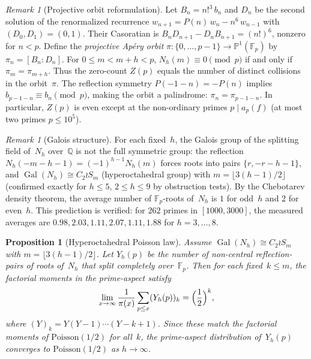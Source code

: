 \documentclass[11pt]{article}
\newtheorem{proposition}[theorem]{Proposition}
\theoremstyle{definition}
\theoremstyle{remark}
\newtheorem{remark}[theorem]{Remark}
\begin{document}
\begin{remark}[Projective orbit reformulation]\label{rem:orbit}
Let $B_n = n!^3\,b_n$ and $D_n$ be the second solution of the
renormalized recurrence $w_{n+1} = P(n)\,w_n - n^6\,w_{n-1}$
with $(D_0, D_1) = (0, 1)$. Their Casoratian is
$B_n D_{n+1} - D_n B_{n+1} = (n!)^6$, nonzero for $n < p$.
Define the \emph{projective Ap\'ery orbit}
$\pi \colon \{0,\ldots,p{-}1\} \to \mathbb{P}^1(\mathbb{F}_p)$
by $\pi_n = [B_n : D_n]$.
For $0 \le m < m + h < p$,
$N_h(m) \equiv 0 \pmod{p}$ if and only if $\pi_m = \pi_{m+h}$.
Thus the zero-count $Z(p)$ equals the number of
distinct collisions in the orbit~$\pi$.
The reflection symmetry $P(-1{-}n) = -P(n)$ implies
$b_{p-1-n} \equiv b_n \pmod{p}$, making the orbit a
palindrome: $\pi_n = \pi_{p-1-n}$. In particular,
$Z(p)$ is even except at the non-ordinary primes
$p \mid a_p(f)$ (at most two primes $p \le 10^5$).
\end{remark}

\begin{remark}[Galois structure]\label{rem:galois}
For each fixed~$h$, the Galois group of the splitting
field of~$N_h$ over~$\mathbb{Q}$ is not the full
symmetric group: the reflection
$N_h(-m{-}h{-}1) = (-1)^{h-1}N_h(m)$ forces roots into
pairs $\{r, -r{-}h{-}1\}$, and $\operatorname{Gal}(N_h)
\cong C_2 \wr S_m$ (hyperoctahedral group) with
$m = \lfloor 3(h{-}1)/2 \rfloor$
(confirmed exactly for $h \le 5$, $2 \le h \le 9$
by obstruction tests). By the Chebotarev density
theorem, the average number of $\mathbb{F}_p$-roots
of~$N_h$ is $1$ for odd~$h$ and $2$ for even~$h$.
This prediction is verified: for $262$ primes
in $[1000, 3000]$, the measured averages are
$0.98, 2.03, 1.11, 2.07, 1.11, 1.88$
for $h = 3, \ldots, 8$.
\end{remark}

\begin{proposition}[Hyperoctahedral Poisson law]\label{prop:poisson}
Assume $\operatorname{Gal}(N_h) \cong C_2 \wr S_m$ with
$m = \lfloor 3(h{-}1)/2 \rfloor$.
Let $Y_h(p)$ be the number of non-central reflection-pairs
of roots of~$N_h$ that split completely
over~$\mathbb{F}_p$.
Then for each fixed~$k \le m$, the factorial moments
in the prime-aspect satisfy
\[
\lim_{x \to \infty} \frac{1}{\pi(x)} \sum_{p \le x}
  (Y_h(p))_k = \Bigl(\frac{1}{2}\Bigr)^k,
\]
where $(Y)_k = Y(Y{-}1)\cdots(Y{-}k{+}1)$.
Since these match the factorial moments of
$\mathrm{Poisson}(1/2)$ for all~$k$,
the prime-aspect distribution of~$Y_h(p)$
converges to $\mathrm{Poisson}(1/2)$ as $h \to \infty$.
\end{proposition}
\end{document}
